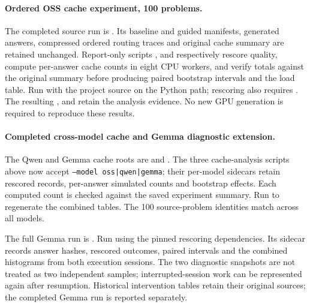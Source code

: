\paragraph{Ordered OSS cache experiment, 100 problems.}
The completed source run is
.
Its baseline and guided manifests, generated answers, compressed ordered
routing traces and original cache summary are retained unchanged.
Report-only scripts ,
 and
 respectively rescore quality, compute
per-answer cache counts in eight CPU workers, and verify totals against
the original summary before producing paired bootstrap intervals and the
load table. Run with the project source on the Python path; rescoring also
requires . The resulting
,
 and
 retain the analysis evidence.
No new GPU generation is required to reproduce these results.


\paragraph{Completed cross-model cache and Gemma diagnostic extension.}
The Qwen and Gemma cache roots are
 and
.
The three cache-analysis scripts above now accept
\texttt{--model oss|qwen|gemma}; their per-model sidecars retain rescored
records, per-answer simulated counts and bootstrap effects. Each computed
count is checked against the saved experiment summary. Run
 to regenerate the
combined tables. The 100 source-problem identities match across all models.

The full Gemma run is
.
Run  using the pinned
rescoring dependencies. Its sidecar 
records answer hashes, rescored outcomes, paired intervals and the combined
histograms from both execution sessions. The two diagnostic snapshots are
not treated as two independent samples; interrupted-session work can be
represented again after resumption. Historical intervention tables retain
their original sources; the completed Gemma run is reported separately.
